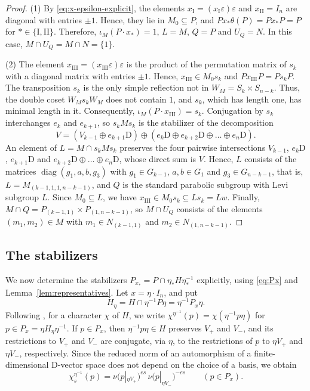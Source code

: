\documentclass[11pt]{amsart}
\numberwithin{equation}{section}
\theoremstyle{plain}
\theoremstyle{definition}
\theoremstyle{remark}
\DeclareMathOperator{\diag}{diag}
\begin{document}
\begin{proof}
	(1) By \eqref{eq:x-epsilon-explicit}, the elements $x_{\mathrm I}=(x_{\mathrm I}\varepsilon)\varepsilon$ and $x_{\mathrm{II}}=I_n$ are diagonal with entries $\pm1$. Hence, they lie in $M_0\subseteq P$, and $Px_*\theta(P)=Px_*P=P$ for $*\in\{\mathrm I,\mathrm{II}\}$. Therefore, $\iota_M(P\cdot x_*)=1$, $L=M$, $Q=P$ and $U_Q=N$. In this case, $M\cap U_Q=M\cap N=\{1\}$.
	
	(2) The element $x_{\mathrm{III}}=(x_{\mathrm{III}}\varepsilon)\varepsilon$ is the product of the permutation matrix of $s_k$ with a diagonal matrix with entries $\pm1$. Hence, $x_{\mathrm{III}}\in M_0s_k$ and $Px_{\mathrm{III}}P=Ps_kP$. The transposition $s_k$ is the only simple reflection not in $W_M=S_k\times S_{n-k}$. Thus, the double coset $W_Ms_kW_M$ does not contain $1$, and $s_k$, which has length one, has minimal length in it. Consequently, $\iota_M(P\cdot x_{\mathrm{III}})=s_k$. Conjugation by $s_k$ interchanges $e_k$ and $e_{k+1}$, so $s_kMs_k$ is the stabilizer of the decomposition
	$$
	V=(V_{k-1}\oplus e_{k+1}\mathrm{D})\oplus(e_k\mathrm{D}\oplus e_{k+2}\mathrm{D}\oplus\dots\oplus e_n\mathrm{D}).
	$$
	An element of $L=M\cap s_kMs_k$ preserves the four pairwise intersections $V_{k-1}$, $e_k\mathrm{D}$, $e_{k+1}\mathrm{D}$ and $e_{k+2}\mathrm{D}\oplus\dots\oplus e_n\mathrm{D}$, whose direct sum is $V$. Hence, $L$ consists of the matrices $\diag(g_1,a,b,g_3)$ with $g_1\in G_{k-1}$, $a,b\in G_1$ and $g_3\in G_{n-k-1}$, that is, $L=M_{(k-1,1,1,n-k-1)}$, and $Q$ is the standard parabolic subgroup with Levi subgroup $L$. Since $M_0\subseteq L$, we have $x_{\mathrm{III}}\in M_0s_k\subseteq Ls_k=Lw$. Finally, $M\cap Q=P_{(k-1,1)}\times P_{(1,n-k-1)}$, so $M\cap U_Q$ consists of the elements $(m_1,m_2)\in M$ with $m_1\in N_{(k-1,1)}$ and $m_2\in N_{(1,n-k-1)}$.
\end{proof}

\subsection{The stabilizers}\label{ss:stabilizers}

We now determine the stabilizers $P_{x_*}=P\cap\eta_*H\eta_*^{-1}$ explicitly, using \eqref{eq:Px} and Lemma~\ref{lem:representatives}. Let $x=\eta\cdot I_n$, and put
$$
H_\eta=H\cap\eta^{-1}P\eta=\eta^{-1}P_x\eta.
$$
Following \cite{Off17}, for a character $\chi$ of $H$, we write $\chi^{\eta^{-1}}(p)=\chi(\eta^{-1}p\eta)$ for $p\in P_x=\eta H_\eta\eta^{-1}$. If $p\in P_x$, then $\eta^{-1}p\eta\in H$ preserves $V_+$ and $V_-$, and its restrictions to $V_+$ and $V_-$ are conjugate, via $\eta$, to the restrictions of $p$ to $\eta V_+$ and $\eta V_-$, respectively. Since the reduced norm of an automorphism of a finite-dimensional $\mathrm{D}$-vector space does not depend on the choice of a basis, we obtain
\begin{equation}\label{eq:chi-y}
	\chi_s^{\eta^{-1}}(p)=\nu\big(p|_{\eta V_+}\big)^{es}\,\nu\big(p|_{\eta V_-}\big)^{-es}\qquad(p\in P_x).
\end{equation}
\end{document}
